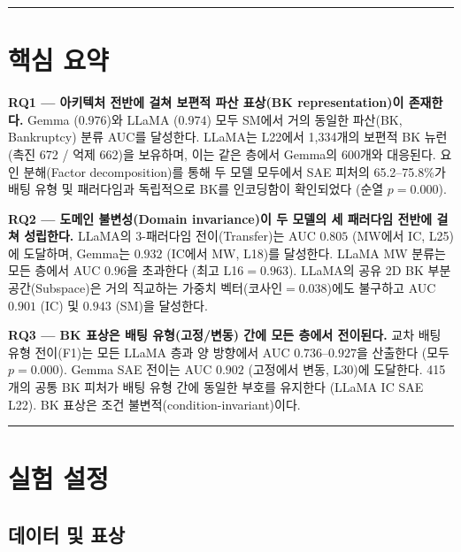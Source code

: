 \documentclass[11pt,a4paper]{article}
\begin{document}
\bigskip\hrule\bigskip

\section*{핵심 요약}

\textbf{RQ1 --- 아키텍처 전반에 걸쳐 보편적 파산 표상(BK representation)이 존재한다.} Gemma ($0.976$)와 LLaMA ($0.974$) 모두 SM에서 거의 동일한 파산(BK, Bankruptcy) 분류 AUC를 달성한다. LLaMA는 L22에서 1,334개의 보편적 BK 뉴런(촉진 672 / 억제 662)을 보유하며, 이는 같은 층에서 Gemma의 600개와 대응된다. 요인 분해(Factor decomposition)를 통해 두 모델 모두에서 SAE 피처의 65.2--75.8\%가 배팅 유형 및 패러다임과 독립적으로 BK를 인코딩함이 확인되었다 (순열 $p=0.000$).

\medskip\textbf{RQ2 --- 도메인 불변성(Domain invariance)이 두 모델의 세 패러다임 전반에 걸쳐 성립한다.} LLaMA의 3-패러다임 전이(Transfer)는 AUC $0.805$ (MW에서 IC, L25)에 도달하며, Gemma는 $0.932$ (IC에서 MW, L18)를 달성한다. LLaMA MW 분류는 모든 층에서 AUC $0.96$을 초과한다 (최고 L16$=0.963$). LLaMA의 공유 2D BK 부분공간(Subspace)은 거의 직교하는 가중치 벡터(코사인$=0.038$)에도 불구하고 AUC $0.901$ (IC) 및 $0.943$ (SM)을 달성한다.

\medskip\textbf{RQ3 --- BK 표상은 배팅 유형(고정/변동) 간에 모든 층에서 전이된다.} 교차 배팅 유형 전이(F1)는 모든 LLaMA 층과 양 방향에서 AUC $0.736$--$0.927$을 산출한다 (모두 $p=0.000$). Gemma SAE 전이는 AUC $0.902$ (고정에서 변동, L30)에 도달한다. 415개의 공통 BK 피처가 배팅 유형 간에 동일한 부호를 유지한다 (LLaMA IC SAE L22). BK 표상은 조건 불변적(condition-invariant)이다.

\bigskip\hrule\bigskip

\section{실험 설정}

\subsection{데이터 및 표상}
\end{document}
